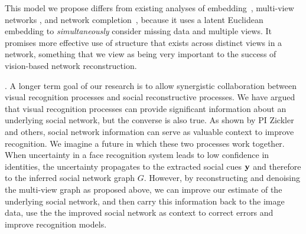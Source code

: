 This model we propose differs from existing analyses of embedding~\cite{Hoff01latentspace,Hancocklatent}, multi-view networks \cite{AiroldiBFX08,Kim12}, and network completion~\cite{Clauset,Guimera,HannekeX09,KimL11}, because it uses a latent Euclidean embedding to \emph{simultaneously} consider missing data and multiple views. It promises more effective use of structure that exists across distinct views in a network, something that we view as being very important to the success of vision-based network reconstruction. 


\label{sec:closeloop}

. A longer term goal of our research is to allow synergistic collaboration between visual recognition processes and social reconstructive processes. We have argued that visual recognition processes can provide significant information about an underlying social network, but the converse is also true. As shown by PI Zickler~\cite{Stone2008,Stone2010} and others, social network information can serve as valuable context to improve recognition. We imagine a future in which these two processes work together. When uncertainty in a face recognition system leads to low confidence in identities, the uncertainty propagates to the extracted social cues ${\bf y}$ and therefore to the inferred social network graph $G$. However, by reconstructing and denoising the multi-view graph as proposed above, we can improve our estimate of the underlying social network, and then carry this information back to the image data, use the the improved social network as context to correct  errors and improve recognition models.
